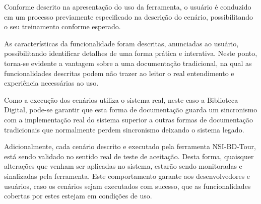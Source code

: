 Conforme descrito na apresentação do uso da ferramenta, o usuário é conduzido em um processo previamente especificado na descrição do cenário, possibilitando o seu treinamento conforme esperado.

As características da funcionalidade foram descritas, anunciadas ao usuário, possibilitando identificar detalhes de uma forma prática e interativa. Neste ponto, torna-se evidente a vantagem sobre a uma documentação tradicional, na qual as funcionalidades descritas podem não trazer ao leitor o real entendimento e experiência necessárias ao uso.

Como a execução dos cenários utiliza o sistema real, neste caso a Biblioteca Digital, pode-se garantir que esta forma de documentação guarda um sincronismo com a implementação real do sistema superior a outras formas de documentação tradicionais que normalmente perdem sincronismo deixando o sistema legado.

Adicionalmente, cada cenário descrito e executado pela ferramenta NSI-BD-Tour, está sendo validado no sentido real de teste de aceitação. Desta forma, quaisquer alterações que venham ser aplicadas no sistema, estarão sendo monitoradas e sinalizadas pela ferramenta. Este comportamento garante aos desenvolvedores e usuários, caso os cenários sejam executados com sucesso, que as funcionalidades cobertas por estes estejam em condições de uso.